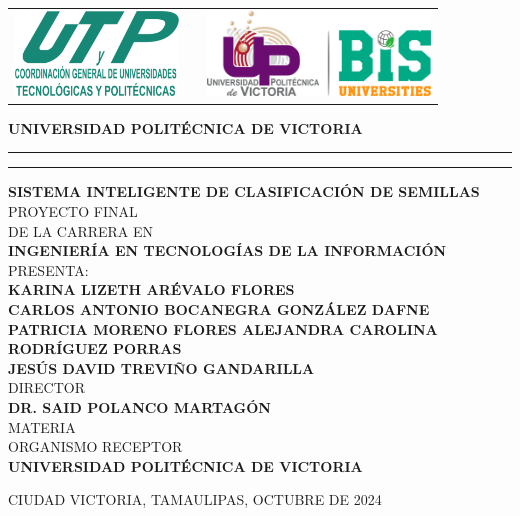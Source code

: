 \documentclass[12pt]{article}
\date{\specialdate\today}
\newcommand{\HRule}{\rule{\linewidth}{0.25mm}}
\newcommand{\ncarrera}            {Ingeniería en Tecnologías de la Información}
\newcommand{\nasesorinstitucional}{Dr. SAID POLANCO MARTAGÓN}
\newcommand{\NombreAlumno}{Karina Lizeth Arévalo Flores \\ Carlos Antonio Bocanegra González Dafne Patricia Moreno Flores
Alejandra Carolina Rodríguez Porras \\
Jesús David Treviño Gandarilla}
\newcommand{\NombreProyecto}{Sistema Inteligente de Clasificación de Semillas}
\newcommand{\organismoreceptor}   {Universidad Politécnica de Victoria}
\newcommand{\fechaPortada}               {Octubre de 2024}
\newcommand{\separacionCorta}{0.0cm}
\newcommand{\separacionLarga}{0.5cm}
\newcommand{\iemph}[1]{\MakeTextUppercase{#1}}
\begin{document}
\setcounter{page}{1}
\thispagestyle{empty}

\begin{center}

\begin{tabular}{cp{5cm}c}
\includegraphics[height=2.25cm]{UTYP.png} & 
& \includegraphics[height=2.25cm]{LogoUPV_2023.png}   \\
\end{tabular}

\Large \textbf{UNIVERSIDAD POLITÉCNICA DE VICTORIA}
\vspace{0.5cm}
\hrule
\vspace{0.1cm} 
\hrule
\vspace{0.5cm}


\textbf{\iemph{\NombreProyecto}} \\[\separacionLarga]
PROYECTO FINAL \\
DE LA CARRERA EN \\
\textbf{\iemph{\ncarrera}} \\[\separacionLarga]

PRESENTA: \\[\separacionCorta]
\textbf{\iemph{\NombreAlumno}}\\[\separacionLarga]


DIRECTOR \\[\separacionCorta]
\textbf{\iemph{\nasesorinstitucional}} \\[\separacionCorta]


 MATERIA \\[\separacionCorta]

ORGANISMO RECEPTOR \\[\separacionCorta]
\textbf{\iemph{\organismoreceptor}} \\[\separacionLarga]

\end{center}
\begin{flushright}
\iemph{Ciudad Victoria, Tamaulipas, \fechaPortada}
\end{flushright}
\end{document}
